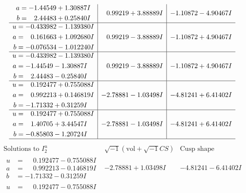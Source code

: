 \documentclass[1p]{elsarticle_modified}
\theoremstyle{definition}
\newcommand{\I}{\sqrt{-1}}
\begin{document}
$$\begin{array}{c|c|c}
\begin{aligned}
a &= -1.44549 + 1.30887 I \\
b &= \phantom{-}2.44483 + 0.25840 I\end{aligned}
 & \phantom{-}0.99219 + 3.88889 I & -1.10872 - 4.90467 I \\ \hline\begin{aligned}
u &= -0.433982 - 1.139380 I \\
a &= \phantom{-}0.161663 + 1.092680 I \\
b &= -0.076534 - 1.012240 I\end{aligned}
 & \phantom{-}0.99219 - 3.88889 I & -1.10872 + 4.90467 I \\ \hline\begin{aligned}
u &= -0.433982 - 1.139380 I \\
a &= -1.44549 - 1.30887 I \\
b &= \phantom{-}2.44483 - 0.25840 I\end{aligned}
 & \phantom{-}0.99219 - 3.88889 I & -1.10872 + 4.90467 I \\ \hline\begin{aligned}
u &= \phantom{-}0.192477 + 0.755088 I \\
a &= \phantom{-}0.992213 + 0.146819 I \\
b &= -1.71332 + 0.31259 I\end{aligned}
 & -2.78881 - 1.03498 I & -4.81241 + 6.41402 I \\ \hline\begin{aligned}
u &= \phantom{-}0.192477 + 0.755088 I \\
a &= \phantom{-}1.40705 + 3.44547 I \\
b &= -0.85803 - 1.20724 I\end{aligned}
 & -2.78881 - 1.03498 I & -4.81241 + 6.41402 I\\
 \hline 
 \end{array}$$\newpage$$\begin{array}{c|c|c}  
\text{Solutions to }I^u_{2}& \I (\text{vol} + \sqrt{-1}CS) & \text{Cusp shape}\\
 \hline 
\begin{aligned}
u &= \phantom{-}0.192477 - 0.755088 I \\
a &= \phantom{-}0.992213 - 0.146819 I \\
b &= -1.71332 - 0.31259 I\end{aligned}
 & -2.78881 + 1.03498 I & -4.81241 - 6.41402 I \\ \hline\begin{aligned}
u &= \phantom{-}0.192477 - 0.755088 I \\

\end{aligned}
\end{array}$$
\end{document}
